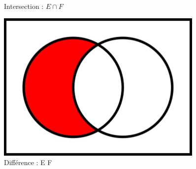 \documentclass[10pt,a4paper]{book}
\begin{document}
\begin{figure}
\begin{minipage}{0.3\textwidth}
        \caption{Intersection :  $E \cap F$}
    \end{minipage}
    \begin{minipage}{0.3\textwidth}
        \centering
        \includegraphics[width=0.9\textwidth]{Venn0100.png}
        \caption{Différence : E \setminus F}
    \end{minipage}
\end{figure}
   
\end{document}
